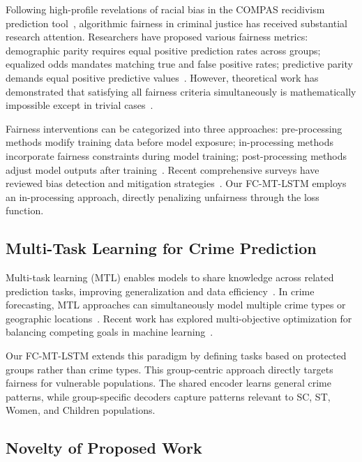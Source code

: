 \documentclass[conference]{IEEEtran}
\begin{document}
Following high-profile revelations of racial bias in the COMPAS recidivism prediction tool~\cite{angwin2016machine, dressel2018accuracy}, algorithmic fairness in criminal justice has received substantial research attention. Researchers have proposed various fairness metrics: demographic parity requires equal positive prediction rates across groups; equalized odds mandates matching true and false positive rates; predictive parity demands equal positive predictive values~\cite{verma2018fairness}. However, theoretical work has demonstrated that satisfying all fairness criteria simultaneously is mathematically impossible except in trivial cases~\cite{kleinberg2016inherent}.

Fairness interventions can be categorized into three approaches: pre-processing methods modify training data before model exposure; in-processing methods incorporate fairness constraints during model training; post-processing methods adjust model outputs after training~\cite{hardt2016equality}. Recent comprehensive surveys have reviewed bias detection and mitigation strategies~\cite{wang2023fairness, mishra2023fairness}. Our FC-MT-LSTM employs an in-processing approach, directly penalizing unfairness through the loss function.

\subsection{Multi-Task Learning for Crime Prediction}

Multi-task learning (MTL) enables models to share knowledge across related prediction tasks, improving generalization and data efficiency~\cite{caruana1997multitask}. In crime forecasting, MTL approaches can simultaneously model multiple crime types or geographic locations~\cite{zhang2021survey}. Recent work has explored multi-objective optimization for balancing competing goals in machine learning~\cite{chatterjee2023multi}.

Our FC-MT-LSTM extends this paradigm by defining tasks based on protected groups rather than crime types. This group-centric approach directly targets fairness for vulnerable populations. The shared encoder learns general crime patterns, while group-specific decoders capture patterns relevant to SC, ST, Women, and Children populations.

\subsection{Novelty of Proposed Work}
\end{document}
